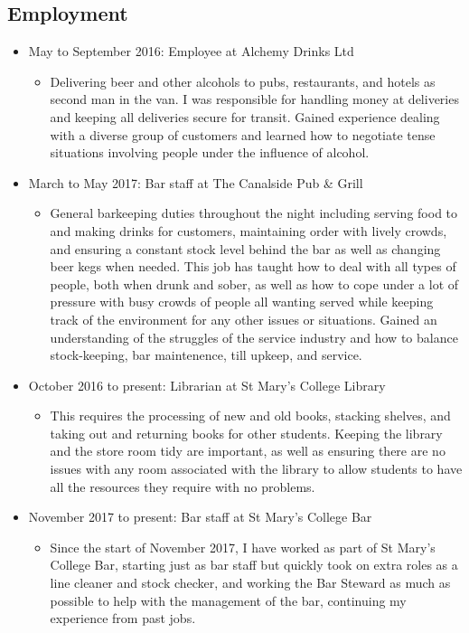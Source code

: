\documentclass[10pt, a4paper]{article}
\begin{document}
	\subsection{Employment}
	\begin{itemize}
		\item May to September 2016: Employee at Alchemy Drinks Ltd
		\begin{itemize}
			\item Delivering beer and other alcohols to pubs, restaurants, and hotels as second man in the van. I was responsible for handling money at deliveries and keeping all deliveries secure for transit. Gained experience dealing with a diverse group of customers and learned how to negotiate tense situations involving people under the influence of alcohol.
		\end{itemize}
		\item March to May 2017: Bar staff at The Canalside Pub \& Grill
		\begin{itemize}
			\item General barkeeping duties throughout the night including serving food to and making drinks for customers, maintaining order with lively crowds, and ensuring a constant stock level behind the bar as well as changing beer kegs when needed. This job has taught how to deal with all types of people, both when drunk and sober, as well as how to cope under a lot of pressure with busy crowds of people all wanting served while keeping track of the environment for any other issues or situations. Gained an understanding of the struggles of the service industry and how to balance stock-keeping, bar maintenence, till upkeep, and service.
		\end{itemize}
		\item October 2016 to present: Librarian at St Mary's College Library
		\begin{itemize}
			\item This requires the processing of new and old books, stacking shelves, and taking out and returning books for other students. Keeping the library and the store room tidy are important, as well as ensuring there are no issues with any room associated with the library to allow students to have all the resources they require with no problems.
		\end{itemize}
		\item November 2017 to present: Bar staff at St Mary's College Bar
		\begin{itemize}
			\item Since the start of November 2017, I have worked as part of St Mary's College Bar, starting just as bar staff but quickly took on extra roles as a line cleaner and stock checker, and working the Bar Steward as much as possible to help with the management of the bar, continuing my experience from past jobs.
		\end{itemize}
	\end{itemize}
\end{document}
